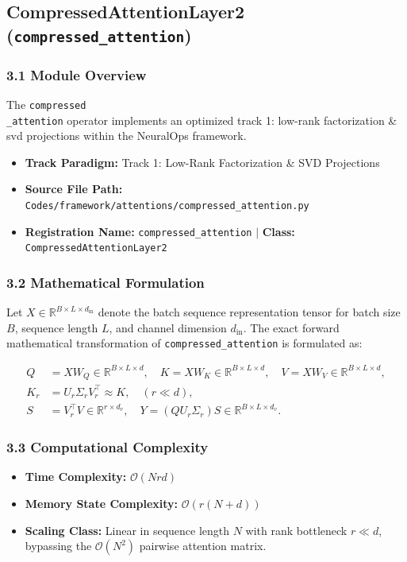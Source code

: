 \subsection{CompressedAttentionLayer2 (\texttt{compressed\_attention})}
\label{sec:app_module_compressed_attention}

\subsubsection*{3.1 Module Overview}
The \texttt{compressed\\_attention} operator implements an optimized track 1: low-rank factorization \& svd projections within the NeuralOps framework.
\begin{itemize}
    \item \textbf{Track Paradigm:} Track 1: Low-Rank Factorization & SVD Projections
    \item \textbf{Source File Path:} \texttt{Codes/framework/attentions/compressed\_attention.py}
    \item \textbf{Registration Name:} \texttt{compressed\_attention} $\mid$ \textbf{Class:} \texttt{CompressedAttentionLayer2}
\end{itemize}

\subsubsection*{3.2 Mathematical Formulation}
Let $X \in \mathbb{R}^{B \times L \times d_{\text{in}}}$ denote the batch sequence representation tensor for batch size $B$, sequence length $L$, and channel dimension $d_{\text{in}}$. The exact forward mathematical transformation of \texttt{compressed\_attention} is formulated as:

\begin{align}
Q &= X W_Q \in \mathbb{R}^{B \times L \times d}, \quad K = X W_K \in \mathbb{R}^{B \times L \times d}, \quad V = X W_V \in \mathbb{R}^{B \times L \times d}, \\
K_r &= U_r \Sigma_r V_r^\top \approx K, \quad (r \ll d), \\
S &= V_r^\top V \in \mathbb{R}^{r \times d_v}, \quad Y = (Q U_r \Sigma_r) S \in \mathbb{R}^{B \times L \times d_v}.
\end{align}


\subsubsection*{3.3 Computational Complexity}
\begin{itemize}
    \item \textbf{Time Complexity:} $\mathcal{O}(N r d)$
    \item \textbf{Memory State Complexity:} $\mathcal{O}(r(N + d))$
    \item \textbf{Scaling Class:} Linear in sequence length $N$ with rank bottleneck $r \ll d$, bypassing the $\mathcal{O}(N^2)$ pairwise attention matrix.
\end{itemize}

